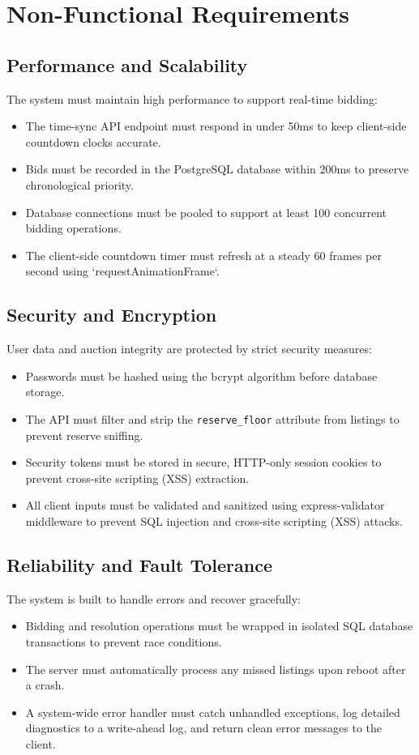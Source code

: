 \documentclass[12pt,a4paper,oneside]{report}
\begin{document}
\section{Non-Functional Requirements}

\subsection{Performance and Scalability}
The system must maintain high performance to support real-time bidding:
\begin{itemize}
    \item The time-sync API endpoint must respond in under 50ms to keep client-side countdown clocks accurate.
    \item Bids must be recorded in the PostgreSQL database within 200ms to preserve chronological priority.
    \item Database connections must be pooled to support at least 100 concurrent bidding operations.
    \item The client-side countdown timer must refresh at a steady 60 frames per second using `requestAnimationFrame`.
\end{itemize}

\subsection{Security and Encryption}
User data and auction integrity are protected by strict security measures:
\begin{itemize}
    \item Passwords must be hashed using the bcrypt algorithm before database storage.
    \item The API must filter and strip the \texttt{reserve\_floor} attribute from listings to prevent reserve sniffing.
    \item Security tokens must be stored in secure, HTTP-only session cookies to prevent cross-site scripting (XSS) extraction.
    \item All client inputs must be validated and sanitized using express-validator middleware to prevent SQL injection and cross-site scripting (XSS) attacks.
\end{itemize}

\subsection{Reliability and Fault Tolerance}
The system is built to handle errors and recover gracefully:
\begin{itemize}
    \item Bidding and resolution operations must be wrapped in isolated SQL database transactions to prevent race conditions.
    \item The server must automatically process any missed listings upon reboot after a crash.
    \item A system-wide error handler must catch unhandled exceptions, log detailed diagnostics to a write-ahead log, and return clean error messages to the client.
\end{itemize}
\end{document}

